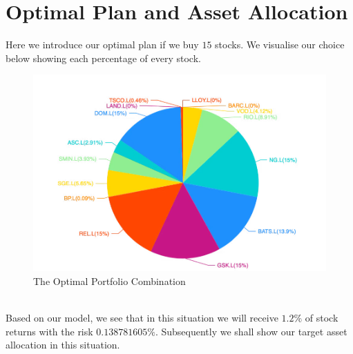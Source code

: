 

\section{Optimal Plan and Asset Allocation}

Here we introduce our optimal plan if we buy $15$ stocks. We visualise our choice below showing each percentage of every stock.

\begin{figure}[htp]
    \includegraphics[width=15cm]{./optimal.png}
    \caption{The Optimal Portfolio Combination}
    \label{optimal}
\end{figure}

\hspace*{\fill}\\
Based on our model, we see that in this situation we will receive $1.2\%$ of stock returns with the risk $0.138781605\%$. Subsequently we shall show our target asset allocation in this situation.

